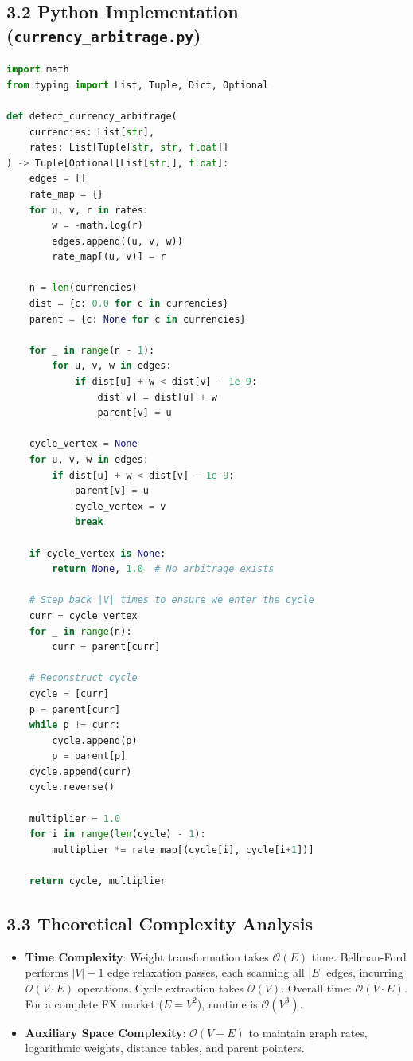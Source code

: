 \documentclass[12pt]{article}
\begin{document}
\subsection*{3.2 Python Implementation (\texttt{currency\_arbitrage.py})}
\begin{lstlisting}[language=Python]
import math
from typing import List, Tuple, Dict, Optional

def detect_currency_arbitrage(
    currencies: List[str],
    rates: List[Tuple[str, str, float]]
) -> Tuple[Optional[List[str]], float]:
    edges = []
    rate_map = {}
    for u, v, r in rates:
        w = -math.log(r)
        edges.append((u, v, w))
        rate_map[(u, v)] = r

    n = len(currencies)
    dist = {c: 0.0 for c in currencies}
    parent = {c: None for c in currencies}

    for _ in range(n - 1):
        for u, v, w in edges:
            if dist[u] + w < dist[v] - 1e-9:
                dist[v] = dist[u] + w
                parent[v] = u

    cycle_vertex = None
    for u, v, w in edges:
        if dist[u] + w < dist[v] - 1e-9:
            parent[v] = u
            cycle_vertex = v
            break

    if cycle_vertex is None:
        return None, 1.0  # No arbitrage exists

    # Step back |V| times to ensure we enter the cycle
    curr = cycle_vertex
    for _ in range(n):
        curr = parent[curr]

    # Reconstruct cycle
    cycle = [curr]
    p = parent[curr]
    while p != curr:
        cycle.append(p)
        p = parent[p]
    cycle.append(curr)
    cycle.reverse()

    multiplier = 1.0
    for i in range(len(cycle) - 1):
        multiplier *= rate_map[(cycle[i], cycle[i+1])]

    return cycle, multiplier
\end{lstlisting}

\subsection*{3.3 Theoretical Complexity Analysis}
\begin{itemize}
    \item \textbf{Time Complexity}: Weight transformation takes $\mathcal{O}(E)$ time. Bellman-Ford performs $|V| - 1$ edge relaxation passes, each scanning all $|E|$ edges, incurring $\mathcal{O}(V \cdot E)$ operations. Cycle extraction takes $\mathcal{O}(V)$. Overall time: $\mathcal{O}(V \cdot E)$. For a complete FX market ($E = V^2$), runtime is $\mathcal{O}(V^3)$.
    \item \textbf{Auxiliary Space Complexity}: $\mathcal{O}(V + E)$ to maintain graph rates, logarithmic weights, distance tables, and parent pointers.
\end{itemize}
\end{document}
